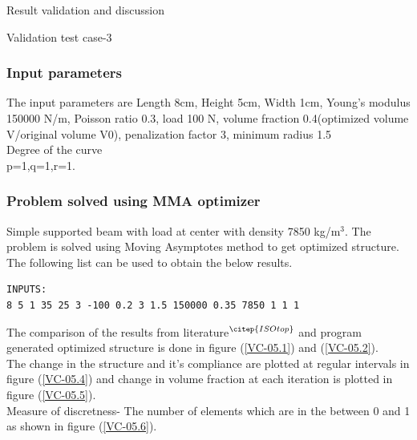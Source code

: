 \documentclass[a4paper,12pt,times]{article}
\begin{document}
\begin{section}{Result validation and discussion}
\begin{subsection}{Validation test case-3}
\subsubsection{Input parameters}
The input parameters are Length 8cm, Height 5cm, Width 1cm, Young's modulus 150000 N/m, Poisson ratio 0.3, load 100 N, volume fraction 0.4(optimized volume V/original volume V0), penalization factor 3, minimum radius 1.5 \\ 
Degree of the curve\\
p=1,q=1,r=1.

\subsubsection{Problem solved using MMA optimizer}
Simple supported beam with load at center with density 7850 kg/m$^3$. The problem is solved using Moving Asymptotes method to get optimized structure. The following list can be used to obtain the below results.\\
\begin{lstlisting}
INPUTS:
8 5 1 35 25 3 -100 0.2 3 1.5 150000 0.35 7850 1 1 1
\end{lstlisting}
The comparison of the results from literature$^{\citep{ISOtop}}$ and program generated optimized structure is done in figure (\ref{VC-05.1}) and (\ref{VC-05.2}).\\
The change in the structure and it's compliance are plotted at regular intervals in figure (\ref{VC-05.4}) and change in volume fraction at each iteration is plotted in figure (\ref{VC-05.5}).\\
Measure of discretness- The number of elements which are in the between 0 and 1 as shown in figure (\ref{VC-05.6}).\\
 

\end{subsection}
\end{section}
\end{document}
